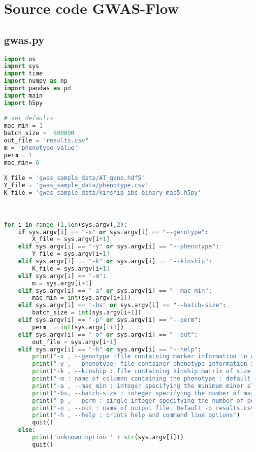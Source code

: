 
\chapter{Source code GWAS-Flow} %

\label{AppendixA} %


\linespread{1.5} 
\section{gwas.py}
\begin{lstlisting}[language=Python]
import os
import sys
import time
import numpy as np
import pandas as pd
import main
import h5py

# set defaults 
mac_min = 1
batch_size =  500000 
out_file = "results.csv"
m = 'phenotype_value'
perm = 1
mac_min= 6

X_file = 'gwas_sample_data/AT_geno.hdf5'
Y_file = 'gwas_sample_data/phenotype.csv'
K_file = 'gwas_sample_data/kinship_ibs_binary_mac5.h5py'



for i in range (1,len(sys.argv),2):
    if sys.argv[i] == "-x" or sys.argv[i] == "--genotype":
        X_file = sys.argv[i+1]
    elif sys.argv[i] == "-y" or sys.argv[i] == "--phenotype":
        Y_file = sys.argv[i+1]
    elif sys.argv[i] == "-k" or sys.argv[i] == "--kinship":
        K_file = sys.argv[i+1]
    elif sys.argv[i] == "-m":
        m = sys.argv[i+1]
    elif sys.argv[i] == "-a" or sys.argv[i] == "--mac_min":
        mac_min = int(sys.argv[i+1])
    elif sys.argv[i] == "-bs" or sys.argv[i] == "--batch-size":
        batch_size = int(sys.argv[i+1])
    elif sys.argv[i] == "-p" or sys.argv[i] == "--perm":
        perm  = int(sys.argv[i+1])
    elif sys.argv[i] == "-o" or sys.argv[i] == "--out":
        out_file = sys.argv[i+1]
    elif sys.argv[i] == "-h" or sys.argv[i] == "--help":
        print("-x , --genotype :file containing marker information in csv or hdf5 format of size")
        print("-y , --phenotype: file container phenotype information in csv format"  )
        print("-k , --kinship : file containing kinship matrix of size k X k in csv or hdf5 format")
        print("-m : name of columnn containing the phenotype : default m = phenotype_value")
        print("-a , --mac_min : integer specifying the minimum minor allele count necessary for a marker to be included. Default a = 1" )
        print("-bs, --batch-size : integer specifying the number of markers processed at once. Default -bs 500000" )
        print("-p , --perm : single integer specifying the number of permutations. Default 1 == no perm ")
        print("-o , --out : name of output file. Default -o results.csv  ")
        print("-h , --help : prints help and command line options")
        quit()
    else:
        print('unknown option ' + str(sys.argv[i]))
        quit()




\end{lstlisting}

